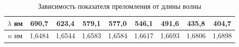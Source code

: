 \begin{table}[h!]
    \centering
    \begin{tabular}{|c|c|c|c|c|c|c|c|c|}
		\hline	
		$\lambda$ нм & 690,7  & 623,4  & 579,1  & 577,0  & 546,1  & 491,6  & 435,8  & 404,7  \\ \hline
		$n$ нм       & 1,6484 & 1,6544 & 1,6583 & 1,6584 & 1,6617 & 1,6693 & 1,6806 & 1,6898 \\ \hline
	\end{tabular}
    \caption{Зависимость показателя преломления от длины волны}
    \label{table:n}
\end{table}